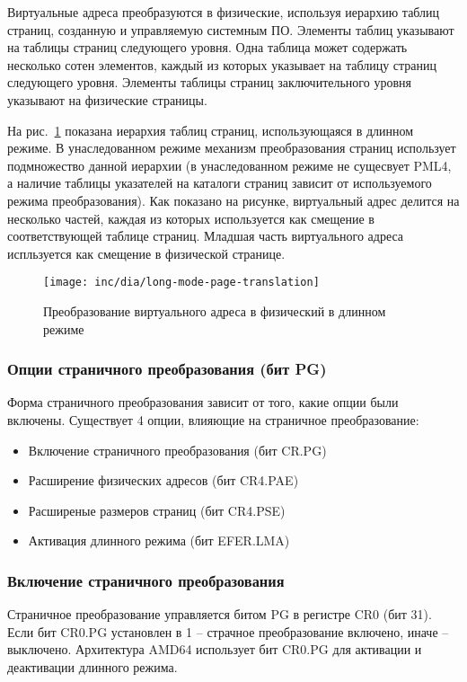 Виртуальные адреса преобразуются в физические, используя иерархию таблиц страниц, созданную и управляемую системным ПО.
Элементы таблиц указывают на таблицы страниц следующего уровня. Одна таблица может содержать несколько сотен элементов,
каждый из которых указывает на таблицу страниц следующего уровня. Элементы таблицы страниц заключительного уровня
указывают на физические страницы.

На рис.~\ref{fig:long-mode-page-translation} показана иерархия таблиц страниц, использующаяся в длинном режиме.
В унаследованном режиме механизм преобразования страниц использует подмножество данной иерархии (в унаследованном
режиме не сущесвует PML4, а наличие таблицы указателей на каталоги страниц зависит от используемого режима преобразования).
Как показано на рисунке, виртуальный адрес делится на несколько частей, каждая из которых используется как смещение
в соответствующей таблице страниц. Младшая часть виртуального адреса испльзуется как смещение в физической странице.

\begin{figure}[ht]
  \centering
  \texttt{[image: inc/dia/long-mode-page-translation]}
  \caption{Преобразование виртуального адреса в физический в длинном режиме}
  \label{fig:long-mode-page-translation}
\end{figure}

\subsubsection*{Опции страничного преобразования (бит PG)}
Форма страничного преобразования зависит от того, какие опции были включены. Существует
4 опции, влияющие на страничное преобразование:
\begin{itemize}
	\item Включение страничного преобразования (бит CR.PG)
	\item Расширение физических адресов (бит CR4.PAE)
	\item Расширеные размеров страниц (бит CR4.PSE)
	\item Активация длинного режима (бит EFER.LMA)
\end{itemize}

\subsubsection*{Включение страничного преобразования}
Страничное преобразование управляется битом PG в регистре CR0 (бит 31). Если бит CR0.PG установлен в 1 --
страчное преобразование включено, иначе -- выключено. Архитектура AMD64 использует бит CR0.PG для активации
и деактивации длинного режима.

